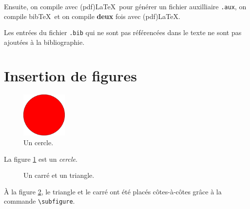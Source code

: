 \documentclass[11pt,twoside,maitrise]{dms}
\theoremstyle{definition}
\numberwithin{equation}{section}
\numberwithin{table}{chapter}
\numberwithin{figure}{chapter}
\begin{document}
Ensuite, on compile avec (pdf)\LaTeX\ pour générer un fichier auxilliaire
\texttt{.aux}, on compile bib\TeX\ et on compile \textbf{deux} fois
avec (pdf)\LaTeX.

Les entrées du fichier \verb|.bib| qui ne sont pas référencées
dans le texte ne sont pas ajoutées à la bibliographie.

\section{Insertion de figures}


\begin{figure}[t]
    \centering
    \includegraphics[width=0.2\textwidth]{figures/cercle.pdf}
    \caption{Un cercle.}
    \label{fig:Cercle}
\end{figure}
La figure \ref{fig:Cercle} est un \emph{cercle}.
\begin{figure}[t]
    \centering
    \hspace{2cm}
    \caption{\label{fig:TriCar}Un carré et un triangle.}
\end{figure}
À la figure \ref{fig:TriCar}, le triangle  et le carré  ont été placés côtes-à-côtes grâce à la commande \verb|\subfigure|.


\end{document}
